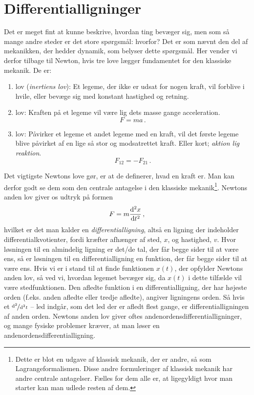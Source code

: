 \section{Differentialligninger} \label{mat:sec:diffeq}
Det er meget fint at kunne beskrive, hvordan ting bevæger sig, men som så mange andre steder er det store spørgsmål: hvorfor?
Det er som nævnt den del af mekanikken, der hedder dynamik, som belyser dette spørgsmål. Her vender vi derfor tilbage til Newton, hvis tre love lægger fundamentet for den klassiske mekanik. 
De er:
\begin{enumerate}
    \item lov ({\em inertiens lov}): Et legeme, der ikke er udsat for nogen kraft, vil forblive i hvile, eller bevæge sig med konstant hastighed og retning.
    \item lov: Kraften på et legeme vil være lig dets masse gange acceleration.
    \begin{equation} \label{mat:eq:N2}
        F=ma \, .
    \end{equation}
    \item lov: Påvirker et legeme et andet legeme med en kraft, vil det første legeme blive påvirket af en lige så stor og modsatrettet kraft. Eller kort; {\em aktion lig reaktion}.
    \begin{equation}
        F_{12}=-F_{21} \, .
    \end{equation}
\end{enumerate}
Det vigtigste Newtons love gør, er at de definerer, hvad en kraft er.
Man kan derfor godt se dem som den centrale antagelse i den klassiske mekanik\footnote{Dette er blot en udgave af klassisk mekanik, der er andre, så som Lagrangeformalismen. Disse andre formuleringer af klassisk mekanik har andre centrale antagelser. Fælles for dem alle er, at ligegyldigt hvor man starter kan man udlede resten af dem.}.
Newtons anden lov giver os udtryk på formen
\begin{equation} \label{mat:eq:n2}
    F=m\dv[2]{x}{t} \, ,
\end{equation}
hvilket er det man kalder en \emph{differentialligning}, altså en ligning der indeholder differentialkvotienter, fordi kræfter afhænger af sted, $x$, og hastighed, $v$.
Hvor løsningen til en almindelig ligning er det/de tal, der får begge sider til at være ens, så er løsningen til en differentialligning en funktion, der får begge sider til at være ens.
Hvis vi er i stand til at finde funktionen $x(t)$, der opfylder Newtons anden lov, så ved vi, hvordan legemet bevæger sig, da $x(t)$ i dette tilfælde vil være stedfunktionen.
Den afledte funktion i en differentialligning, der har højeste orden (f.eks. anden afledte eller tredje afledte), angiver ligningens orden. Så hvis et $\nicefrac{\dd^2}{\dd ^2t}$ -- led indgår, som det led der er afledt flest gange, er differentialligningen af anden orden.
Newtons anden lov giver oftes andenordensdifferentialligninger, og
mange fysiske problemer kræver, at man løser en andenordensdifferentialligning.

